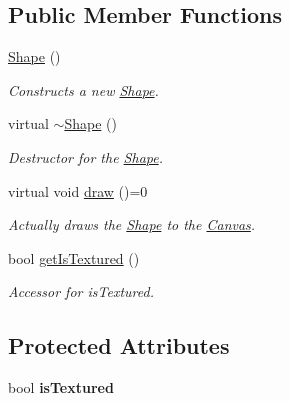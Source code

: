 \subsection*{\-Public \-Member \-Functions}
\begin{DoxyCompactItemize}
\item 
\hyperlink{classtsgl_1_1_shape_ad283a47aa40bf80dcd308cc581c9e2dd}{\-Shape} ()
\begin{DoxyCompactList}\small\item\em \-Constructs a new \hyperlink{classtsgl_1_1_shape}{\-Shape}. \end{DoxyCompactList}\item 
\hypertarget{classtsgl_1_1_shape_aa9bfac883a0748471600fe9752e85948}{virtual \hyperlink{classtsgl_1_1_shape_aa9bfac883a0748471600fe9752e85948}{$\sim$\-Shape} ()}\label{classtsgl_1_1_shape_aa9bfac883a0748471600fe9752e85948}

\begin{DoxyCompactList}\small\item\em \-Destructor for the \hyperlink{classtsgl_1_1_shape}{\-Shape}. \end{DoxyCompactList}\item 
virtual void \hyperlink{classtsgl_1_1_shape_af78b1627b97d621824ce86db214e2402}{draw} ()=0
\begin{DoxyCompactList}\small\item\em \-Actually draws the \hyperlink{classtsgl_1_1_shape}{\-Shape} to the \hyperlink{classtsgl_1_1_canvas}{\-Canvas}. \end{DoxyCompactList}\item 
bool \hyperlink{classtsgl_1_1_shape_aadd0ea81f714328bdf9483851a8b86ad}{get\-Is\-Textured} ()
\begin{DoxyCompactList}\small\item\em \-Accessor for {\ttfamily is\-Textured}. \end{DoxyCompactList}\end{DoxyCompactItemize}
\subsection*{\-Protected \-Attributes}
\begin{DoxyCompactItemize}
\item 
\hypertarget{classtsgl_1_1_shape_a9d5cd6d6a0596a30dbce44eb2d00c583}{bool {\bfseries is\-Textured}}\label{classtsgl_1_1_shape_a9d5cd6d6a0596a30dbce44eb2d00c583}

\end{DoxyCompactItemize}


